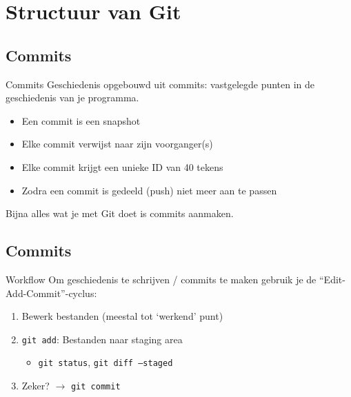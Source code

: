 \section[Structuur]{Structuur van Git}

\subsection{Commits}
\begin{frame}{Commits}
	Geschiedenis opgebouwd uit commits: vastgelegde punten in de geschiedenis van je programma.
	\begin{itemize}
		\item Een commit is een snapshot
		\item Elke commit verwijst naar zijn voorganger(s)
		\item Elke commit krijgt een unieke ID van 40 tekens
		\item Zodra een commit is gedeeld (push) niet meer aan te passen
	\end{itemize}

	Bijna alles wat je met Git doet is commits aanmaken.
\end{frame}

\subsection{Commits}
\begin{frame}{Workflow}
	Om geschiedenis te schrijven / commits te maken gebruik je de ``Edit-Add-Commit''-cyclus:
	\begin{enumerate}
		\item Bewerk bestanden (meestal tot `werkend' punt)
		\item \texttt{git add}: Bestanden naar staging area
		\begin{itemize}
			\item \texttt{git status}, \texttt{git diff --staged}
		\end{itemize}
		\item Zeker? $\rightarrow$ \texttt{git commit}
	\end{enumerate}
\end{frame}
